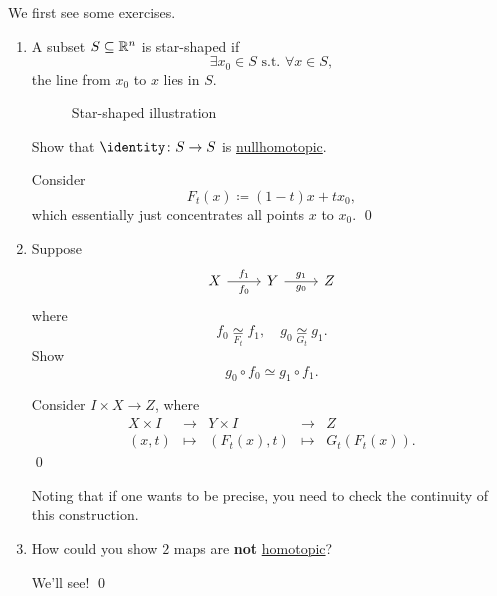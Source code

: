\begin{exercise}
	We first see some exercises.
	\begin{enumerate}
		\item A subset \(S\subseteq \mathbb{\MakeUppercase{R}} ^n\) is star-shaped if
		      \[
			      \exists x_0\in S \text{ s.t. }\forall x\in S,
		      \]
		      the line from \(x_0\) to \(x\) lies in \(S\).
		      \begin{figure}[H]
			      \centering
			      \caption{Star-shaped illustration}
			      \label{fig:eg:star-shaped}
		      \end{figure}
		      Show that \(\identity\colon S\to S\) is \hyperref[def:nullhomotopic]{nullhomotopic}.

		      \begin{answer}
			      Consider
			      \[
				      F_{t}(x) \coloneqq (1 - t)x+tx_0,
			      \]
			      which essentially just concentrates all points \(x\) to \(x_0\).
			      \qed
		      \end{answer}
		\item Suppose
		      \[
			      \begin{tikzcd}
				      X \ar[r,"f_1", "f_0"'] & Y \ar[r,"g_1", "g_0"'] & Z
			      \end{tikzcd}
		      \]
		      where
		      \[
			      f_0 \underset{F_{t}}{\simeq} f_1,\quad g_0\underset{G_{t}}{\simeq} g_1.
		      \]
		      Show
		      \[
			      g_0\circ f_0\simeq g_{1}\circ f_1.
		      \]
		      \begin{answer}
			      Consider \(I\times X\to Z\), where
			      \[
				      \begin{array}{ccccc}
					      X \times I & \to     & Y \times I  & \to     & Z                \\
					      (x, t)     & \mapsto & (F_t(x), t) & \mapsto & G_{t}(F_{t}(x)).
				      \end{array}
			      \]
			      \qed
		      \end{answer}
		      \begin{remark}
			      Noting that if one wants to be precise, you need to check the continuity of this construction.
		      \end{remark}
		\item How could you show \(2\) maps are \textbf{not} \hyperref[def:homotopic]{homotopic}?
		      \begin{answer}
			      We'll see!
			      \qed
		      \end{answer}
	\end{enumerate}
\end{exercise}